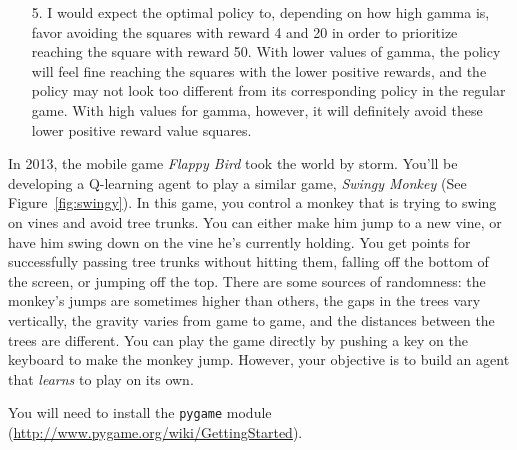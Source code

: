\documentclass[submit]{harvardml}
\begin{document}
\begin{itemize}
    \item[5.]       
    I would expect the optimal policy to, depending on how high gamma is, favor
    avoiding the squares with reward 4 and 20 in order to prioritize reaching the
    square with reward 50. With lower values of gamma, the policy will feel fine
    reaching the squares with the lower positive rewards, and the policy may not look 
    too different from its corresponding policy in the regular game. With high
    values for gamma, however, it will definitely avoid these lower positive reward value squares.
\end{itemize}



\begin{problem}
  In 2013, the mobile game \emph{Flappy Bird} took the world by storm. You'll be developing a Q-learning agent to play a similar game, \emph{Swingy Monkey} (See Figure~\ref{fig:swingy}).  In this game, you control a monkey that is trying to swing on vines and avoid tree trunks.  You can either make him jump to a new vine, or have him swing down on the vine he's currently holding.  You get points for successfully passing tree trunks without hitting them, falling off the bottom of the screen, or jumping off the top.  There are some sources of randomness: the monkey's jumps are sometimes higher than others, the gaps in the trees vary vertically, the gravity varies from game to game, and the distances between the trees are different.  You can play the game directly by pushing a key on the keyboard to make the monkey jump.  However, your objective is to build an agent that \emph{learns} to play on its own. 
  
   You will need to install the \verb|pygame| module
  (\url{http://www.pygame.org/wiki/GettingStarted}).
  


\end{problem}
\end{document}
